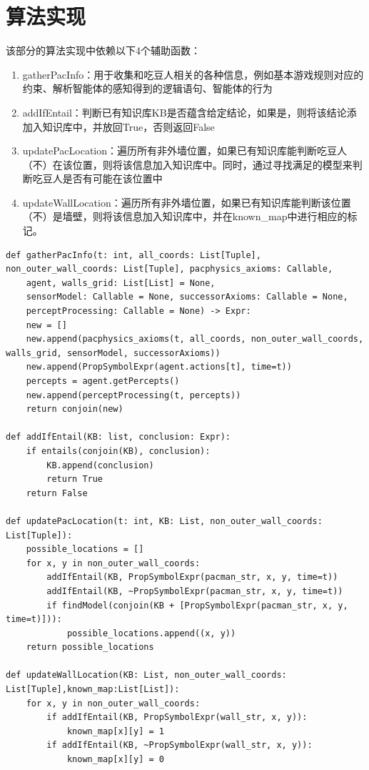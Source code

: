 \section{算法实现}
%
%
该部分的算法实现中依赖以下4个辅助函数：
\begin{enumerate}
    \item gatherPacInfo：用于收集和吃豆人相关的各种信息，例如基本游戏规则对应的约束、解析智能体的感知得到的逻辑语句、智能体的行为
    \item addIfEntail：判断已有知识库KB是否蕴含给定结论，如果是，则将该结论添加入知识库中，并放回True，否则返回False
    \item updatePacLocation：遍历所有非外墙位置，如果已有知识库能判断吃豆人（不）在该位置，则将该信息加入知识库中。同时，通过寻找满足的模型来判断吃豆人是否有可能在该位置中
    \item updateWallLocation：遍历所有非外墙位置，如果已有知识库能判断该位置（不）是墙壁，则将该信息加入知识库中，并在known\_map中进行相应的标记。
\end{enumerate}
\begin{lstlisting}[emph={[3]t,KB,agent,sensorModel,successorAxioms,perceptProcessing},emphstyle={[3]\color{vscode_parametercolor}},emph={[4]Expr,SearchProblem,Callable,Node,Actions,Reached,Any,List,Tuple},emphstyle={[4]\color{vscode_classcolor}}]
def gatherPacInfo(t: int, all_coords: List[Tuple], non_outer_wall_coords: List[Tuple], pacphysics_axioms: Callable,
    agent, walls_grid: List[List] = None,
    sensorModel: Callable = None, successorAxioms: Callable = None,
    perceptProcessing: Callable = None) -> Expr:
    new = []
    new.append(pacphysics_axioms(t, all_coords, non_outer_wall_coords, walls_grid, sensorModel, successorAxioms))
    new.append(PropSymbolExpr(agent.actions[t], time=t))
    percepts = agent.getPercepts()
    new.append(perceptProcessing(t, percepts))
    return conjoin(new)

def addIfEntail(KB: list, conclusion: Expr):
    if entails(conjoin(KB), conclusion):
        KB.append(conclusion)
        return True
    return False

def updatePacLocation(t: int, KB: List, non_outer_wall_coords: List[Tuple]):
    possible_locations = []
    for x, y in non_outer_wall_coords:
        addIfEntail(KB, PropSymbolExpr(pacman_str, x, y, time=t))
        addIfEntail(KB, ~PropSymbolExpr(pacman_str, x, y, time=t))
        if findModel(conjoin(KB + [PropSymbolExpr(pacman_str, x, y, time=t)])):
            possible_locations.append((x, y))
    return possible_locations

def updateWallLocation(KB: List, non_outer_wall_coords: List[Tuple],known_map:List[List]):
    for x, y in non_outer_wall_coords:
        if addIfEntail(KB, PropSymbolExpr(wall_str, x, y)):
            known_map[x][y] = 1
        if addIfEntail(KB, ~PropSymbolExpr(wall_str, x, y)):
            known_map[x][y] = 0
\end{lstlisting}
